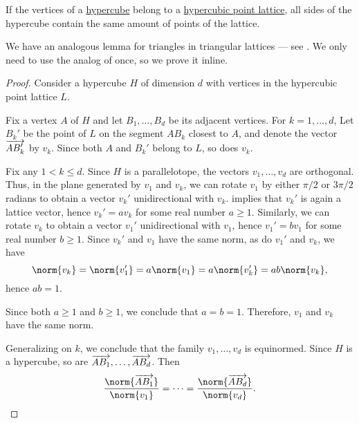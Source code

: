 \begin{lemma}\label{thm:hypercubic_point_lattice_hypercube}
  If the vertices of a \hyperref[def:hypercube]{hypercube} belong to a \hyperref[def:hypercubic_point_lattice]{hypercubic point lattice}, all sides of the hypercube contain the same amount of points of the lattice.
\end{lemma}
\begin{comments}
  \item We have an analogous lemma for triangles in triangular lattices --- see . We only need to use the analog of  once, so we prove it inline.
\end{comments}
\begin{proof}
  Consider a hypercube \( H \) of dimension \( d \) with vertices in the hypercubic point lattice \( L \).

  Fix a vertex \( A \) of \( H \) and let \( B_1, \ldots, B_d \) be its adjacent vertices. For \( k = 1, \ldots, d \), Let \( B_k' \) be the point of \( L \) on the segment \( A B_k \) closest to \( A \), and denote the vector \( \overrightarrow{A B_k'} \) by \( v_k \). Since both \( A \) and \( B_k' \) belong to \( L \), so does \( v_k \).

  Fix any \( 1 < k \leq d \). Since \( H \) is a parallelotope, the vectors \( v_1, \ldots, v_d \) are orthogonal. Thus, in the plane generated by \( v_1 \) and \( v_k \), we can rotate \( v_1 \) by either \( \pi / 2 \) or \( 3\pi / 2 \) radians to obtain a vector \( v_k' \) unidirectional with \( v_k \).  implies that \( v_k' \) is again a lattice vector, hence \( v_k' = a v_k \) for some real number \( a \geq 1 \). Similarly, we can rotate \( v_k \) to obtain a vector \( v_1' \) unidirectional with \( v_1 \), hence \( v_1' = b v_1 \) for some real number \( b \geq 1 \). Since \( v_k' \) and \( v_1 \) have the same norm, as do \( v_1' \) and \( v_k \), we have
  \begin{equation*}
    \norm{v_k} = \norm{v_1'} = a \norm{v_1} = a \norm{v_k'} = ab \norm{v_k},
  \end{equation*}
  hence \( ab = 1 \).

  Since both \( a \geq 1 \) and \( b \geq 1 \), we conclude that \( a = b = 1 \). Therefore, \( v_1 \) and \( v_k \) have the same norm.

  Generalizing on \( k \), we conclude that the family \( v_1, \ldots, v_d \) is equinormed. Since \( H \) is a hypercube, so are \( \overrightarrow{AB_1}, \ldots, \overrightarrow{AB_d} \). Then
  \begin{equation*}
    \frac {\norm{\vect{A B_1}}} {\norm{v_1}} = \cdots = \frac {\norm{\vect{A B_d}}} {\norm{v_d}}.
  \end{equation*}


\end{proof}

